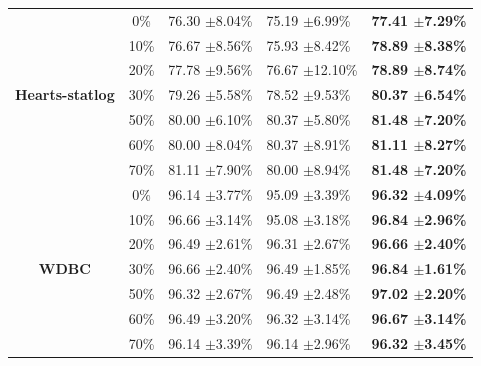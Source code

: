 \documentclass[12pt,a4paper,oneside,english]{report}
\begin{document}
\begin{table}[htbp]
\begin{tabular*}{\linewidth}{@{\extracolsep{\fill}} |c|clll| }
		~ & 0\% & 76.30 $\pm$8.04\%  & 75.19 $\pm$6.99\%  & \textbf{77.41 $\pm$7.29\%} \\
		~ & 10\% & 76.67 $\pm$8.56\%  & 75.93 $\pm$8.42\%  & \textbf{78.89 $\pm$8.38\%} \\ 
            ~ & 20\% & 77.78 \(\pm\)9.56\%  & 76.67 \(\pm\)12.10\% & \textbf{78.89 \(\pm\)8.74\%} \\ 
		\textbf{ Hearts-statlog } & 30\% & 79.26 $\pm$5.58\% & 78.52 $\pm$9.53\% & \textbf{80.37 $\pm$6.54\%}  \\ 
		~ & 50\% & 80.00 $\pm$6.10\%  & 80.37 $\pm$5.80\%  & \textbf{81.48 $\pm$7.20\%}  \\ 
            ~ & 60\% & 80.00 \(\pm\)8.04\%  & 80.37 \(\pm\)8.91\%  & \textbf{81.11 \(\pm\)8.27\% } \\
            ~ & 70\% & 81.11 \(\pm\)7.90\%  & 80.00 \(\pm\)8.94\%  & \textbf{81.48 \(\pm\)7.20\%} \\
		\hline
		~ & 0\% & 96.14 $\pm$3.77\% & 95.09 $\pm$3.39\%  & \textbf{96.32 $\pm$4.09\%} \\ 
		~ & 10\% & 96.66 $\pm$3.14\%  & 95.08 $\pm$3.18\%  & \textbf{96.84 $\pm$2.96\%}  \\ 
            ~ & 20\% & 96.49 \(\pm\)2.61\%  & 96.31 \(\pm\)2.67\% & \textbf{96.66 \(\pm\)2.40\%} \\ 
		\textbf{ WDBC } & 30\% & 96.66 $\pm$2.40\%  & 96.49 $\pm$1.85\% & \textbf{96.84 $\pm$1.61\%} \\ 
		~ & 50\% & 96.32 $\pm$2.67\%  & 96.49 $\pm$2.48\%  & \textbf{97.02 $\pm$2.20\%} \\
            ~ & 60\% & 96.49 \(\pm\)3.20\%  & 96.32 \(\pm\)3.14\% & \textbf{96.67 \(\pm\)3.14\%} \\
            ~ & 70\% & 96.14 \(\pm\)3.39\%  & 96.14 \(\pm\)2.96\% & \textbf{96.32 \(\pm\)3.45\%} \\
		\hline
	\end{tabular*}
	\label{binary}
\end{table}
\end{document}

